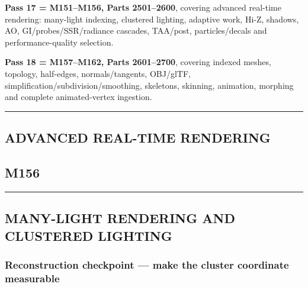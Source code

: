 \textbf{Pass 17 = M151--M156, Parts 2501--2600}, covering advanced real-time rendering: many-light indexing, clustered lighting, adaptive work, Hi-Z, shadows, AO, GI/probes/SSR/radiance cascades, TAA/post, particles/decals and performance-quality selection.

\textbf{Pass 18 = M157--M162, Parts 2601--2700}, covering indexed meshes, topology, half-edges, normals/tangents, OBJ/glTF, simplification/subdivision/smoothing, skeletons, skinning, animation, morphing and complete animated-vertex ingestion.

\begin{center}\rule{0.5\linewidth}{0.5pt}\end{center}

\subsection{ADVANCED REAL-TIME RENDERING}\label{04-visual-computing-ii-ch040-advanced-real-time-rendering}

\hypertarget{04-visual-computing-ii-ch040-advanced-real-time-rendering}{}

\subsection{M156}\label{04-visual-computing-ii-ch040-m156}

\hypertarget{04-visual-computing-ii-ch040-m156}{}

\begin{center}\rule{0.5\linewidth}{0.5pt}\end{center}

\subsection{MANY-LIGHT RENDERING AND CLUSTERED LIGHTING}\label{04-visual-computing-ii-ch040-many-light-rendering-and-clustered-lighting}

\hypertarget{04-visual-computing-ii-ch040-many-light-rendering-and-clustered-lighting}{}

\subsubsection{Reconstruction checkpoint --- make the cluster coordinate measurable}\label{04-visual-computing-ii-ch040-reconstruction-checkpoint-make-the-cluster-coordinate-measurable}

\hypertarget{04-visual-computing-ii-ch040-reconstruction-checkpoint-make-the-cluster-coordinate-measurable}{}

